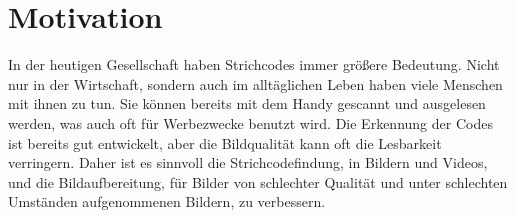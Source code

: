 \section{Motivation}
In der heutigen Gesellschaft haben Strichcodes immer größere Bedeutung. Nicht nur in der Wirtschaft, sondern auch im alltäglichen Leben haben viele Menschen mit ihnen zu tun. Sie können bereits mit dem Handy gescannt und ausgelesen werden, was auch oft für Werbezwecke benutzt wird. Die Erkennung der Codes ist bereits gut entwickelt, aber die Bildqualität kann oft die Lesbarkeit verringern. Daher ist es sinnvoll die Strichcodefindung, in Bildern und Videos, und die Bildaufbereitung, für Bilder von schlechter Qualität und unter schlechten Umständen aufgenommenen Bildern, zu verbessern.
